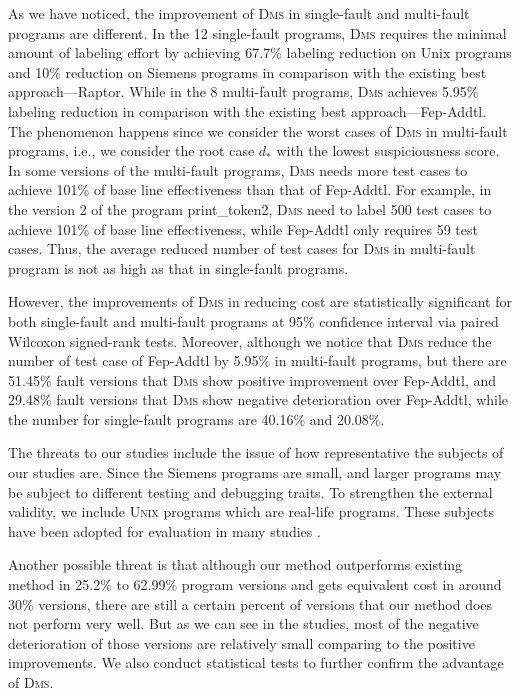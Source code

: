 As we have noticed, the improvement of \textsc{Dms} in single-fault and multi-fault programs are different. In the 12 single-fault programs,  \textsc{Dms} requires the minimal amount of labeling effort by achieving 67.7\% labeling reduction on Unix programs and 10\% reduction on Siemens programs in comparison with the existing best approach---{\sc Raptor}. While in the 8 multi-fault programs, \textsc{Dms} achieves 5.95\% labeling reduction in comparison with the existing best approach---{\sc Fep-Addtl}. The phenomenon happens since we consider the worst cases of \textsc{Dms} in multi-fault programs, i.e., we consider the root case $d_*$ with the lowest suspiciousness score. In some versions of the multi-fault programs, \textsc{Dms} needs more test cases to achieve 101\% of base line effectiveness than that of {\sc Fep-Addtl}. For example, in the version 2 of the program print\_token2, \textsc{Dms} need to label 500 test cases to achieve 101\% of base line effectiveness, while {\sc Fep-Addtl} only requires 59 test cases. Thus, the average reduced number of test cases for \textsc{Dms} in multi-fault program is not as high as that in single-fault programs.

However, the improvements of \textsc{Dms} in reducing cost are statistically significant for both single-fault and multi-fault programs at 95\% confidence interval via paired Wilcoxon signed-rank tests.
Moreover, although we notice that \textsc{Dms} reduce the number of test case of Fep-Addtl by 5.95\% in multi-fault programs, but there are 51.45\% fault versions that \textsc{Dms} show positive improvement over Fep-Addtl, and  29.48\% fault versions that \textsc{Dms} show negative deterioration over Fep-Addtl, while the number for single-fault programs are 40.16\% and 20.08\%.


The threats to our studies include the issue of how
representative the subjects of our studies are. Since the Siemens programs
are small, and larger programs may be subject to different testing and debugging traits.
To strengthen the external validity, we include \textsc{Unix} programs which are
real-life programs. These subjects have been adopted for evaluation in many
studies \citep[e.g.][]{JH05,Abreu:2009.jss,DBLP:conf/icse/SantelicesJYH09}.

Another possible threat is that although our method outperforms existing method
in 25.2\% to 62.99\% program versions and gets equivalent cost in around 30\% versions,
there are still a certain percent of versions that our method does not perform very well.
But as we can see in the studies, most of the negative deterioration of those versions
are relatively small
comparing to the positive improvements. We also
conduct statistical tests to further confirm the advantage of \textsc{Dms}.

